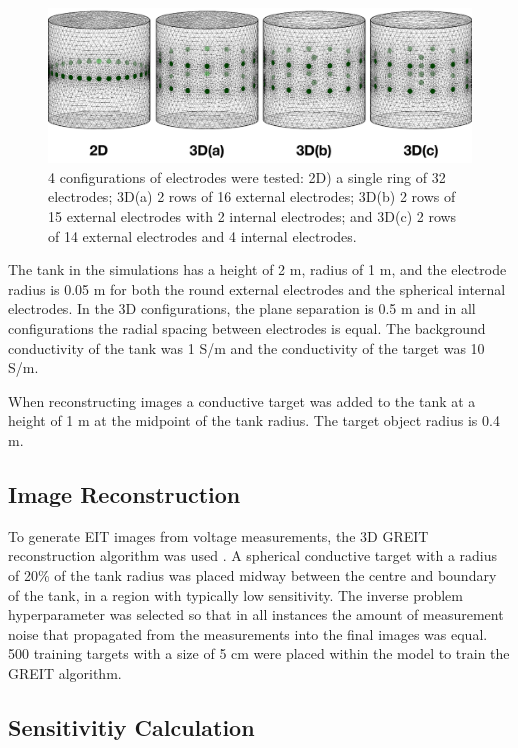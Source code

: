 \begin{figure}[H]
\centering
\includegraphics[width=\textwidth]{chapter6-internal_electrodes/imgs/FEM_Comparison.pdf}
\caption[Internal electrode configurations]{4 configurations of electrodes were tested: 2D) a single ring of 32 electrodes; 
	3D(a) 2 rows of 16 external electrodes; 3D(b) 2 rows of 15 external electrodes with 2 internal electrodes; and 3D(c) 2 rows 
of 14 external electrodes and 4 internal electrodes.}
\label{fig:tank_FEM}
\end{figure}

The tank in the simulations has a height of 2 m, radius of 1 m, and the electrode radius
is 0.05 m for both the round external electrodes and the spherical internal electrodes.
In the 3D configurations, the plane separation is 0.5 m and in all configurations the radial
spacing between electrodes is equal.
The background conductivity of the tank was 1 S/m and the conductivity of the target was
10 S/m.

When reconstructing images a conductive target was added to the tank
at a height of 1 m at the midpoint of the tank radius. The target
object radius is 0.4 m.

\subsection{Image Reconstruction}

To generate EIT images from voltage measurements, the 3D GREIT
reconstruction algorithm
was used \parencite{grychtol_3d_2016}. A spherical
conductive target with a radius of 20\% of the tank radius
was placed midway between the centre and boundary
of the tank, in a region with typically low sensitivity.
The inverse problem hyperparameter
was selected so that in all instances the amount of measurement
noise that propagated from the measurements into the final images
was equal. 500 training targets with a size of 5 cm were placed within the model to train the GREIT 
algorithm. 

\subsection{Sensitivitiy Calculation}

